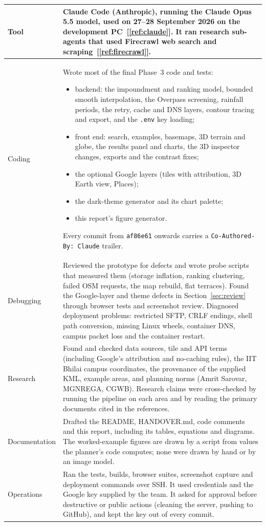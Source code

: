 \documentclass[11pt,a4paper]{article}
\newcommand{\code}[1]{\texttt{#1}}
\begin{document}
\begin{tabularx}{\linewidth}{@{}L{30mm}Y@{}}
\toprule
\textbf{Tool} & \textbf{Claude Code (Anthropic), running the Claude Opus 5.5 model, used on 27--28 September 2026 on the development PC~[\ref{ref:claude}]. It ran research sub-agents that used Firecrawl web search and scraping~[\ref{ref:firecrawl}].}\\
\midrule
Coding & Wrote most of the final Phase~3 code and tests:
\begin{itemize}[leftmargin=*,itemsep=0pt,topsep=1pt]
\item backend: the impoundment and ranking model, bounded smooth interpolation, the Overpass screening, rainfall periods, the retry, cache and DNS layers, contour tracing and export, and the \code{.env} key loading;
\item front end: search, examples, basemaps, 3D terrain and globe, the results panel and charts, the 3D inspector changes, exports and the contrast fixes;
\item the optional Google layers (tiles with attribution, 3D Earth view, Places);
\item the dark-theme generator and its chart palette;
\item this report's figure generator.
\end{itemize}
Every commit from \code{af86e61} onwards carries a \code{Co-Authored-By: Claude} trailer.\\
Debugging & Reviewed the prototype for defects and wrote probe scripts that measured them (storage inflation, ranking clustering, failed OSM requests, the map rebuild, flat terraces). Found the Google-layer and theme defects in Section~\ref{sec:review} through browser tests and screenshot review. Diagnosed deployment problems: restricted SFTP, CRLF endings, shell path conversion, missing Linux wheels, container DNS, campus packet loss and the container restart.\\
Research & Found and checked data sources, tile and API terms (including Google's attribution and no-caching rules), the IIT Bhilai campus coordinates, the provenance of the supplied KML, example areas, and planning norms (Amrit Sarovar, MGNREGA, CGWB). Research claims were cross-checked by running the pipeline on each area and by reading the primary documents cited in the references.\\
Documentation & Drafted the README, HANDOVER.md, code comments and this report, including its tables, equations and diagrams. The worked-example figures are drawn by a script from values the planner's code computes; none were drawn by hand or by an image model.\\
Operations & Ran the tests, builds, browser suites, screenshot capture and deployment commands over SSH. It used credentials and the Google key supplied by the team. It asked for approval before destructive or public actions (cleaning the server, pushing to GitHub), and kept the key out of every commit.\\
\bottomrule
\end{tabularx}
\end{document}
